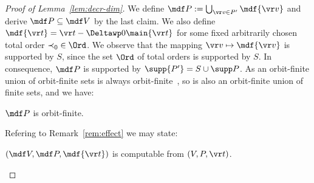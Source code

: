 \begin{proof}[Proof of Lemma~\ref{lem:decr-dim}]
We define  $\mdf P := \bigcup_{\vr v \in P'} \mdf{\vr v}$ and derive $\mdf P \subseteq \mdf V$ by the last claim.
We also define $\mdf{\vr t} = \vr t - \Deltawp 0 {\main{\vr t}}$ for some fixed arbitrarily chosen total order $\prec_0 \; \in \Ord$.
%
We observe that the mapping $\vr v \mapsto \mdf {\vr v}$ is supported by $S$, 
since the set $\Ord$ of total orders is supported by $S$.
In consequence, $\mdf P$ is supported by $\supp {P'} = S\cup \supp P$.
%
As an orbit-finite union of orbit-finite sets is always orbit-finite~\cite[Exercise~62, Sect.~3]{atombook}, 
so is also an orbit-finite union of finite sets, and we have:
\begin{claim}  \label{claim:Po-f} %
$\mdf P$ is orbit-finite.  %
\end{claim}
%
Refering to Remark~\ref{rem:effect} we may state:
%
\begin{claim} \label{claim:comput}
$(\mdf V, \mdf P, \mdf {\vr t})$ is computable from $(V, P, \vr t)$.
\end{claim}



%



\end{proof}
